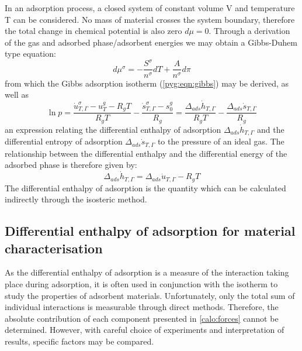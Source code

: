 In an adsorption process, a closed system of constant volume
V and temperature T can be considered. 
No mass of material crosses the system boundary,
therefore the total change in chemical potential is also
zero \(d\mu = 0\). Through
a derivation~\cite{rouquerolAdsorptionPowdersPorous2013} of the
gas and adsorbed phase/adsorbent energies we may obtain a
Gibbs-Duhem type equation:
%
\begin{equation}
	d \mu^{\sigma} = - \frac{S^{\sigma}}{n^{\sigma}} dT + \frac{A}{n^{\sigma}} d \pi
\end{equation}
%
from which the Gibbs adsorption isotherm (\autoref{pyg:eqn:gibbs}) may
be derived, as well as
%
\begin{equation}\label{calo:eqn:enthalpy}
	\ln p = \frac{\dot{u}_{T, \Gamma}^{\sigma} - u_T^g - R_gT}{R_gT} %
	- \frac{\dot{s}_{T, \Gamma}^{\sigma} - s^{g}_{0}}{R_g} %
	= \frac{\Delta_{ads} \dot{h}_{T, \Gamma}}{R_gT} - \frac{\Delta_{ads} \dot{s}_{T, \Gamma}}{R_g}
\end{equation}
%
an expression relating the differential enthalpy of adsorption
\(\Delta_{ads} \dot{h}_{T, \Gamma}\) and
the differential entropy of adsorption \(\Delta_{ads} \dot{s}_{T, \Gamma}\)
to the pressure of an ideal gas.
The relationship between the differential enthalpy and the differential energy
of the adsorbed phase is therefore given by:
%
\begin{equation}\label{calo:eqn:adj}
	\Delta_{ads} \dot{h}_{T, \Gamma} = \Delta_{ads} \dot{u}_{T, \Gamma} - R_gT
\end{equation}
%
The differential enthalpy of adsorption is the quantity which
can be calculated indirectly through the isosteric method.

\subsection{Differential enthalpy of adsorption for material characterisation}

As the differential enthalpy of adsorption is a measure
of the interaction taking place during adsorption, it is often
used in conjunction with the isotherm to study the properties
of adsorbent materials.
Unfortunately, only the total sum of individual interactions
is measurable through direct methods. Therefore, the
absolute contribution of each component presented in
\autoref{calo:forces} cannot be determined.
However, with careful choice of experiments and interpretation
of results, specific factors may be compared.

